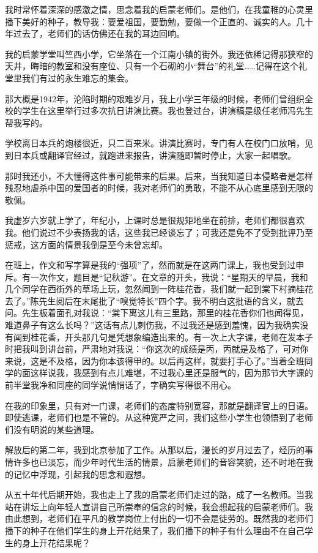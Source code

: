 \documentclass[12pt,UTF-8,openany]{ctexbook}
\begin{document}
\begin{large}
    
    我时常怀着深深的感激之情，思念着我的启蒙老师们。是他们，在我童稚的心灵里播下美好的种子，教导我：要爱祖国，要勤勉，要做一个正直的、诚实的人。几十年过去了，老师们的话仿佛还在我的耳边回响。
    
    我的启蒙学堂叫竺西小学，它坐落在一个江南小镇的街外。我还依稀记得那狭窄的天井，晦暗的教室和没有座位、只有一个石砌的小“舞台”的礼堂……记得在这个礼堂里我们有过的永生难忘的集会。
    
    那大概是1942年，沦陷时期的艰难岁月，我上小学三年级的时候，老师们曾组织全校的学生在这里举行过多次抗日讲演比赛。我也登过台，讲演稿是级任老师冯先生帮我写的。
    
    学校离日本兵的炮楼很近，只二百来米。讲演比赛时，专门有人在校门口放哨，见到日本兵或翻译官经过，就跑进来报告，讲演随即暂时停止，大家一起唱歌。
    
    那时我还小，不大懂得这件事可能带来的后果。后来，当我知道日本侵略者是怎样残忍地虐杀中国的爱国者的时候，我对老师们的勇敢，不能不从心底里感到无限的敬佩。
    
    我虚岁六岁就上学了，年纪小，上课时总是很规矩地坐在前排，老师们都很喜欢我。他们说过不少表扬我的话，这些我已经谈忘了；可我还是免不了受到批评乃至惩戒，这方面的情景我倒是至今未曾忘却。
    
    在班上，作文和写字算是我的“强项”了，然而就是在这两门课上，我也受到过申斥。有一次作文，题目是“记秋游”。在文章的开头，我说：“星期天的早晨，我和几个同学在西街外的草场上玩，忽然闻到一阵桂花香，我们就一起到棠下村摘桂花去了。”陈先生阅后在末尾批了“嗅觉特长”四个字。我不明白这批语的含义，就去问。先生板着面孔对我说：“棠下离这儿有三里路，那里的桂花香你们也闻得见，难道鼻子有这么长吗？”这话有点儿刺伤我，不过我还是感到羞愧，因为我确实没有闻到桂花香，开头那几句是凭想象编造出来的。有一次上大字课，老师在发本子时把我叫到讲台前，严肃地对我说：“你这次的成绩是丙，丙就是及格了，可对你来说，这是不及格，因为你本该得甲的。以后再这样，就要打手心了。”当着全班同学的面这样说我，我感到有点儿难堪，不过我心里还是服气的，因为那节大字课的前半堂我净和同座的同学说悄悄话了，字确实写得很不用心。
    
    在我的印象里，只有对一门课，老师们的态度特别宽容，那就是翻译官上的日语。即使逃课，老师们也是不管的。从这种宽严之间，我们这些小学生也领悟到了老师们没有明说的某些道理。
    
    解放后的第二年，我到北京参加了工作。从那以后，漫长的岁月过去了，经历的事情许多也已淡忘，而少年时代生活的情景，启蒙老师们的音容笑貌，还不时地在我的记忆中浮现，引起我的思念和遐想。
    
    从五十年代后期开始，我也走上了我的启蒙老师们走过的路，成了一名教师。当我站在讲坛上向年轻人宣讲自己所崇奉的信念的时候，我会想起我的启蒙老师们。我由此想到，老师们在平凡的教学岗位上付出的一切不会是徒劳的。既然我的老师们播下的种子在他们学生的身上开花结果了，我们播下的种子有什么理由不在自己学生的身上开花结果呢？
    
\end{large}
\end{document}
